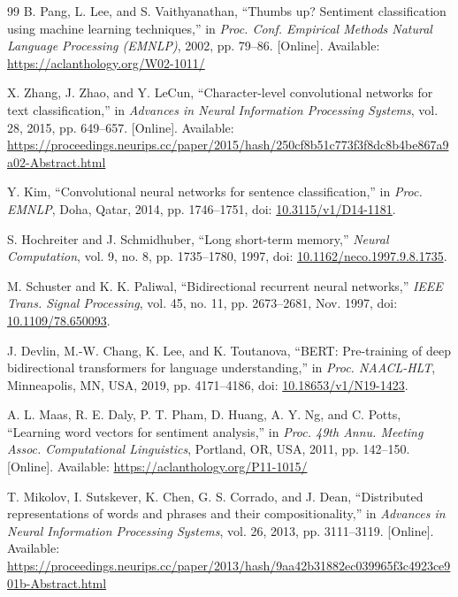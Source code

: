 {}
\begin{thebibliography}{99}
\setlength{\itemsep}{2pt}
B. Pang, L. Lee, and S. Vaithyanathan, ``Thumbs up? Sentiment classification using machine learning techniques,'' in \emph{Proc. Conf. Empirical Methods Natural Language Processing (EMNLP)}, 2002, pp. 79--86. [Online]. Available: \url{https://aclanthology.org/W02-1011/}

X. Zhang, J. Zhao, and Y. LeCun, ``Character-level convolutional networks for text classification,'' in \emph{Advances in Neural Information Processing Systems}, vol. 28, 2015, pp. 649--657. [Online]. Available: \url{https://proceedings.neurips.cc/paper/2015/hash/250cf8b51c773f3f8dc8b4be867a9a02-Abstract.html}

Y. Kim, ``Convolutional neural networks for sentence classification,'' in \emph{Proc. EMNLP}, Doha, Qatar, 2014, pp. 1746--1751, doi: \href{https://doi.org/10.3115/v1/D14-1181}{10.3115/v1/D14-1181}.

S. Hochreiter and J. Schmidhuber, ``Long short-term memory,'' \emph{Neural Computation}, vol. 9, no. 8, pp. 1735--1780, 1997, doi: \href{https://doi.org/10.1162/neco.1997.9.8.1735}{10.1162/neco.1997.9.8.1735}.

M. Schuster and K. K. Paliwal, ``Bidirectional recurrent neural networks,'' \emph{IEEE Trans. Signal Processing}, vol. 45, no. 11, pp. 2673--2681, Nov. 1997, doi: \href{https://doi.org/10.1109/78.650093}{10.1109/78.650093}.

J. Devlin, M.-W. Chang, K. Lee, and K. Toutanova, ``BERT: Pre-training of deep bidirectional transformers for language understanding,'' in \emph{Proc. NAACL-HLT}, Minneapolis, MN, USA, 2019, pp. 4171--4186, doi: \href{https://doi.org/10.18653/v1/N19-1423}{10.18653/v1/N19-1423}.

A. L. Maas, R. E. Daly, P. T. Pham, D. Huang, A. Y. Ng, and C. Potts, ``Learning word vectors for sentiment analysis,'' in \emph{Proc. 49th Annu. Meeting Assoc. Computational Linguistics}, Portland, OR, USA, 2011, pp. 142--150. [Online]. Available: \url{https://aclanthology.org/P11-1015/}

T. Mikolov, I. Sutskever, K. Chen, G. S. Corrado, and J. Dean, ``Distributed representations of words and phrases and their compositionality,'' in \emph{Advances in Neural Information Processing Systems}, vol. 26, 2013, pp. 3111--3119. [Online]. Available: \url{https://proceedings.neurips.cc/paper/2013/hash/9aa42b31882ec039965f3c4923ce901b-Abstract.html}


\end{thebibliography}
